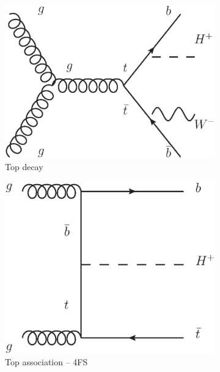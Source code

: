 \begin{figure}[!h]
\centering
\begin{subfigure}{0.3\textwidth}
   \includegraphics[width=\textwidth]{figures/feynmanIa.eps}
\caption{Top decay} 
\end{subfigure} %
\begin{subfigure}{0.3\textwidth}
   \includegraphics[width=\textwidth]{figures/feynmanIIIa.eps}
\caption{Top association -- 4FS}
\end{subfigure} %
\begin{subfigure}{0.3\textwidth}

\end{subfigure}
\end{figure}
